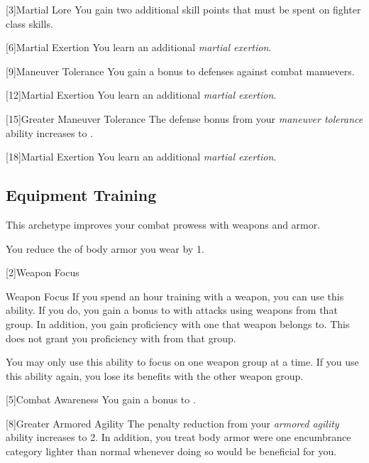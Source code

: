         [3]{Martial Lore} You gain two additional skill points that must be spent on fighter class skills.

        [6]{Martial Exertion}
        You learn an additional \textit{martial exertion}.

        [9]{Maneuver Tolerance} You gain a  bonus to defenses against combat manuevers.

        [12]{Martial Exertion} 
        You learn an additional \textit{martial exertion}.

        [15]{Greater Maneuver Tolerance} The defense bonus from your \textit{maneuver tolerance} ability increases to .

        [18]{Martial Exertion}
        You learn an additional \textit{martial exertion}.

    \subsection{Equipment Training}
        This archetype improves your combat prowess with weapons and armor.

        You reduce the  of body armor you wear by 1.

        [2]{Weapon Focus}
        \begin{ability}{Weapon Focus}
            If you spend an hour training with a weapon, you can use this ability.
            If you do, you gain a  bonus to  with attacks using weapons from that group.
            In addition, you gain proficiency with one  that weapon belongs to.
            This does not grant you proficiency with  from that group.

            You may only use this ability to focus on one weapon group at a time.
            If you use this ability again, you lose its benefits with the other weapon group.
        \end{ability}

        [5]{Combat Awareness}
        You gain a  bonus to .

        [8]{Greater Armored Agility}
        The penalty reduction from your \textit{armored agility} ability increases to 2.
        In addition, you treat body armor were one encumbrance category lighter than normal whenever doing so would be beneficial for you.

